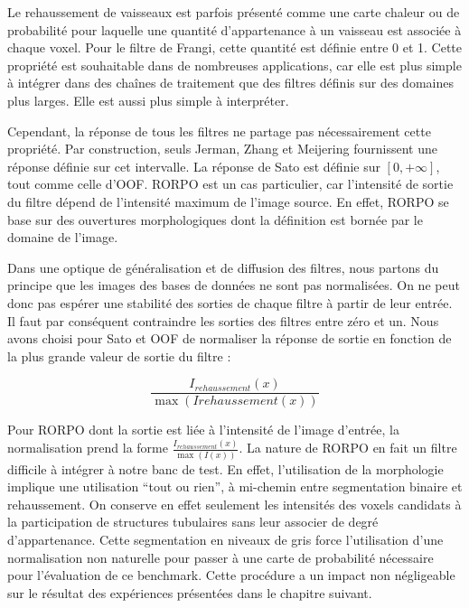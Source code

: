 Le rehaussement de vaisseaux est parfois présenté comme une carte chaleur ou de probabilité pour laquelle une quantité d'appartenance à un vaisseau est associée à chaque voxel. Pour le filtre de Frangi, cette quantité est définie entre 0 et 1. Cette propriété est souhaitable dans de nombreuses applications, car elle est plus simple à intégrer dans des chaînes de traitement que des filtres définis sur des domaines plus larges. Elle est aussi plus simple à interpréter.

Cependant, la réponse de tous les filtres ne partage pas nécessairement cette propriété. Par construction, seuls Jerman, Zhang et Meijering fournissent une réponse définie sur cet intervalle. La réponse de Sato est définie sur $[0,+\infty]$, tout comme celle d'OOF. RORPO est un cas particulier, car l'intensité de sortie du filtre dépend de l'intensité maximum de l'image source. En effet, RORPO se base sur des ouvertures morphologiques dont la définition est bornée par le domaine de l'image. 

Dans une optique de généralisation et de diffusion des filtres, nous partons du principe que les images des bases de données ne sont pas normalisées. On ne peut donc pas espérer une stabilité des sorties de chaque filtre à partir de leur entrée. Il faut par conséquent contraindre les sorties des filtres entre zéro et un. Nous avons choisi pour Sato et OOF de normaliser la réponse de sortie en fonction de la plus grande valeur de sortie du filtre :

\begin{equation}
  \frac{I_{rehaussement}(x)} {\max(I{rehaussement}(x))}
\end{equation}

Pour RORPO dont la sortie est liée à l'intensité de l'image d'entrée, la normalisation prend la forme $ \frac{I_{rehaussement}(x)} {\max(I(x))} $.
La nature de RORPO en fait un filtre difficile à intégrer à notre banc de test. En effet, l'utilisation de la morphologie implique une utilisation ``tout ou rien'', à mi-chemin entre segmentation binaire et rehaussement. On conserve en effet seulement les intensités des voxels candidats à la participation de structures tubulaires sans leur associer de degré d'appartenance. Cette segmentation en niveaux de gris force l'utilisation d'une normalisation non naturelle pour passer à une carte de probabilité nécessaire pour l'évaluation de ce benchmark. Cette procédure a un impact non négligeable sur le résultat des expériences présentées dans le chapitre suivant.


